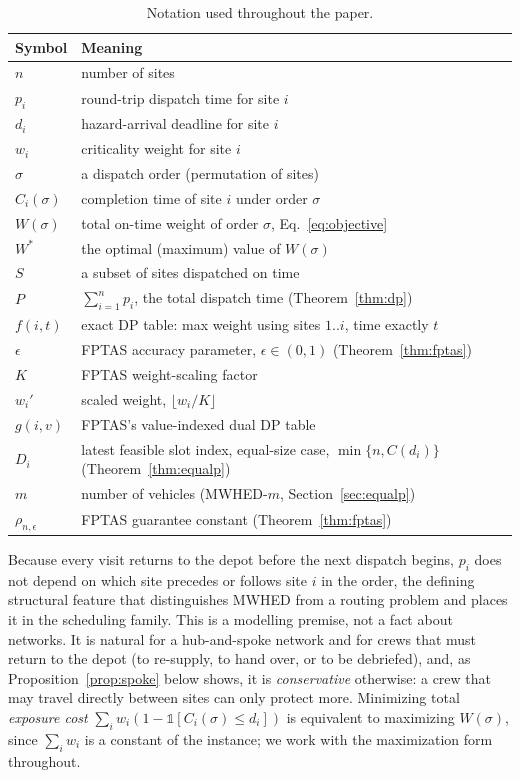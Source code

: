 \documentclass[pdflatex,sn-mathphys-ay]{sn-jnl}
\theoremstyle{thmstyleone}
\theoremstyle{thmstyletwo}
\theoremstyle{thmstylethree}
\begin{document}
\begin{table}[h]
\caption{Notation used throughout the paper.}\label{tab:notation}
\begin{tabular}{@{}ll@{}}
\toprule
Symbol & Meaning \\
\midrule
$n$ & number of sites \\
$p_i$ & round-trip dispatch time for site $i$ \\
$d_i$ & hazard-arrival deadline for site $i$ \\
$w_i$ & criticality weight for site $i$ \\
$\sigma$ & a dispatch order (permutation of sites) \\
$C_i(\sigma)$ & completion time of site $i$ under order $\sigma$ \\
$W(\sigma)$ & total on-time weight of order $\sigma$, Eq.~\eqref{eq:objective} \\
$W^\ast$ & the optimal (maximum) value of $W(\sigma)$ \\
$S$ & a subset of sites dispatched on time \\
$P$ & $\sum_{i=1}^n p_i$, the total dispatch time (Theorem~\ref{thm:dp}) \\
$f(i,t)$ & exact DP table: max weight using sites $1..i$, time exactly $t$ \\
$\epsilon$ & FPTAS accuracy parameter, $\epsilon\in(0,1)$ (Theorem~\ref{thm:fptas}) \\
$K$ & FPTAS weight-scaling factor \\
$w_i'$ & scaled weight, $\lfloor w_i/K\rfloor$ \\
$g(i,v)$ & FPTAS's value-indexed dual DP table \\
$D_i$ & latest feasible slot index, equal-size case, $\min\{n,C(d_i)\}$ (Theorem~\ref{thm:equalp}) \\
$m$ & number of vehicles (MWHED-$m$, Section~\ref{sec:equalp}) \\
$\rho_{n,\epsilon}$ & FPTAS guarantee constant (Theorem~\ref{thm:fptas}) \\
\bottomrule
\end{tabular}
\end{table}

Because every visit returns to the depot before the next dispatch
begins, $p_i$ does not depend on which site precedes or follows site
$i$ in the order, the defining structural feature that distinguishes
MWHED from a routing problem and places it in the scheduling family.
This is a modelling premise, not a fact about networks. It is natural for
a hub-and-spoke network and for crews that must return to the depot
(to re-supply, to hand over, or to be debriefed), and, as
Proposition~\ref{prop:spoke} below shows, it is \emph{conservative}
otherwise: a crew that may travel directly between sites can only protect
more.
Minimizing total \emph{exposure cost} $\sum_i w_i(1 - \mathbb
1[C_i(\sigma)\le d_i])$ is equivalent to maximizing $W(\sigma)$, since
$\sum_i w_i$ is a constant of the instance; we work with the
maximization form throughout.
\end{document}
